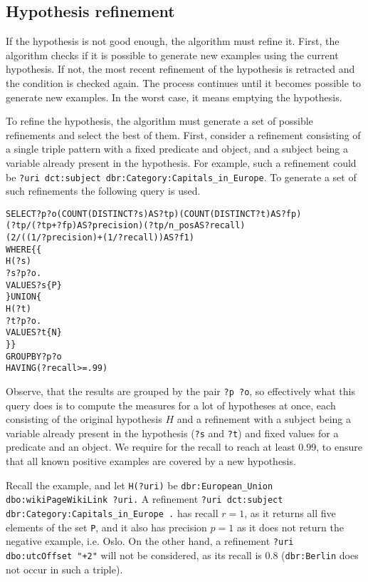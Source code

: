 \documentclass{llncs}
\begin{document}
\subsection{Hypothesis refinement\label{sec:refinement}}

If the hypothesis is not good enough, the algorithm must refine it.
First, the algorithm checks if it is possible to generate new examples using the current hypothesis.
If not, the most recent refinement of the hypothesis is retracted and the condition is checked again.
The process continues until it becomes possible to generate new examples.
In the worst case, it means emptying the hypothesis.

To refine the hypothesis, the algorithm must generate a set of possible refinements and select the best of them.
First, consider a refinement consisting of a single triple pattern with a fixed predicate and object, and a subject being a variable already present in the hypothesis.
For example, such a refinement could be \texttt{?uri dct:subject dbr:Category:Capitals\_in\_Europe}.
To generate a set of such refinements the following query is used.
\begin{alltt}
SELECT ?p ?o (COUNT(DISTINCT ?s) AS ?tp) (COUNT(DISTINCT ?t) AS ?fp) 
        (?tp/(?tp+?fp) AS ?precision) (?tp/n_pos AS ?recall)
        (2/((1/?precision)+(1/?recall)) AS ?f1)
WHERE \{\{
        H(?s)
        ?s ?p ?o .
        VALUES ?s \{ P \}
    \} UNION \{
        H(?t)
        ?t ?p ?o .
        VALUES ?t \{ N \}
    \}\}
GROUP BY ?p ?o
HAVING (?recall>=.99)
\end{alltt}
Observe, that the results are grouped by the pair \texttt{?p ?o}, so effectively what this query does is to compute the measures for a lot of hypotheses at once, each consisting of the original hypothesis $H$ and a refinement with a subject being a variable already present in the hypothesis (\texttt{?s} and \texttt{?t}) and fixed values for a predicate and an object.
We require for the recall to reach at least $0.99$, to ensure that all known positive examples are covered by a new hypothesis.

Recall the example, and let \texttt{H(?uri)} be \texttt{dbr:European\_Union dbo:wikiPageWikiLink ?uri.}
A refinement \texttt{?uri dct:subject dbr:Category:Capitals\_in\_Europe .} has recall $r=1$, as it returns all five elements of the set \texttt{P}, and it also has precision $p=1$ as it does not return the negative example, i.e. Oslo.
On the other hand, a refinement \texttt{?uri dbo:utcOffset "+2"} will not be considered, as its recall is 0.8 (\texttt{dbr:Berlin} does not occur in such a triple).
\end{document}
